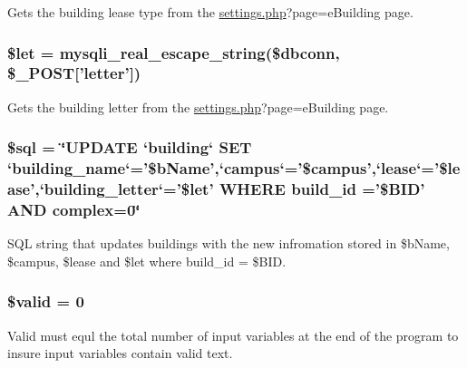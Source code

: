 \-Gets the building lease type from the \hyperlink{settings_8php}{settings.\-php}?page=e\-Building page. \hypertarget{upBuildings_8php_ac3687b5a21519c53f240b5d1c07f997a}{
\subsubsection[{\$let}]{\setlength{\rightskip}{0pt plus 5cm}\$let = mysqli\-\_\-real\-\_\-escape\-\_\-string(\$dbconn, \$\-\_\-\-P\-O\-S\-T\mbox{[}'letter'\mbox{]})}}\label{upBuildings_8php_ac3687b5a21519c53f240b5d1c07f997a}
\-Gets the building letter from the \hyperlink{settings_8php}{settings.\-php}?page=e\-Building page. \hypertarget{upBuildings_8php_a047170d6020a882807665812a27e2525}{
\subsubsection[{\$sql}]{\setlength{\rightskip}{0pt plus 5cm}\$sql = \char`\"{}\-U\-P\-D\-A\-T\-E `building` \-S\-E\-T `building\-\_\-name`='\$b\-Name',`campus`='\$campus',`lease`='\$lease',`building\-\_\-letter`='\$let' \-W\-H\-E\-R\-E build\-\_\-id ='\$\-B\-I\-D' \-A\-N\-D complex=0\char`\"{}}}\label{upBuildings_8php_a047170d6020a882807665812a27e2525}
\-S\-Q\-L string that updates buildings with the new infromation stored in \$b\-Name, \$campus, \$lease and \$let where build\-\_\-id = \$\-B\-I\-D. \hypertarget{upBuildings_8php_a0587674d27d00ef497e08e53ccf45bbb}{
\subsubsection[{\$valid}]{\setlength{\rightskip}{0pt plus 5cm}\$valid = 0}}\label{upBuildings_8php_a0587674d27d00ef497e08e53ccf45bbb}
\-Valid must equl the total number of input variables at the end of the program to insure input variables contain valid text. 